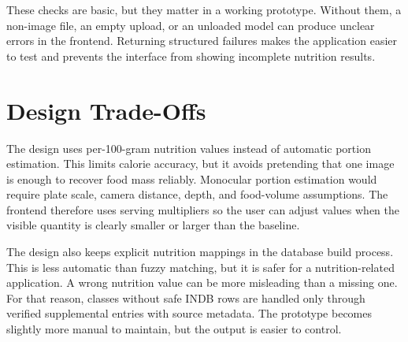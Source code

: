 These checks are basic, but they matter in a working prototype. Without them, a non-image file, an empty upload, or an unloaded model can produce unclear errors in the frontend. Returning structured failures makes the application easier to test and prevents the interface from showing incomplete nutrition results.

\section{Design Trade-Offs}

The design uses per-100-gram nutrition values instead of automatic portion estimation. This limits calorie accuracy, but it avoids pretending that one image is enough to recover food mass reliably. Monocular portion estimation would require plate scale, camera distance, depth, and food-volume assumptions. The frontend therefore uses serving multipliers so the user can adjust values when the visible quantity is clearly smaller or larger than the baseline.

The design also keeps explicit nutrition mappings in the database build process. This is less automatic than fuzzy matching, but it is safer for a nutrition-related application. A wrong nutrition value can be more misleading than a missing one. For that reason, classes without safe INDB rows are handled only through verified supplemental entries with source metadata. The prototype becomes slightly more manual to maintain, but the output is easier to control.


